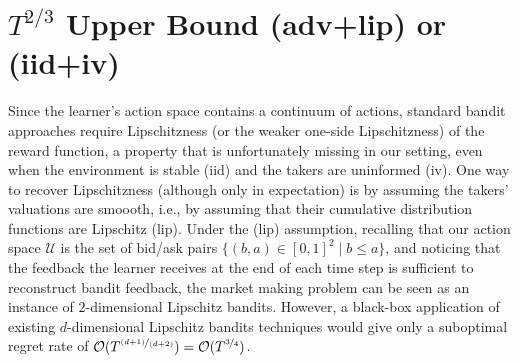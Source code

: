 \documentclass[final,12pt]{colt2025}
\newcommand{\cO}{\mathcal{O}}
\newcommand{\cU}{\mathcal{U}}
\newcommand{\ceq}{\coloneqq}
\newcommand{\nb}{b}
\newcommand{\ns}{a}
\begin{document}
\section{\texorpdfstring{$T^{2/3}$}{T 2/3} Upper Bound (adv+lip) or (iid+iv)}

\label{s:upper}


Since the learner's action space contains a continuum of actions, 
standard bandit approaches require Lipschitzness (or the weaker one-side Lipschitzness) of the reward function, a property that is unfortunately missing in our setting, even when the environment is stable (iid) and the takers are uninformed (iv).
One way to recover Lipschitzness (although only in expectation) is by assuming the takers' valuations are smoooth, i.e., by assuming that their cumulative distribution functions are Lipschitz (lip).
Under the (lip) assumption, recalling that our action space $\cU$ is the set of bid/ask pairs $\{(\nb,\ns) \in [0,1]^2 \mid \nb \le \ns\}$, and noticing that the feedback the learner receives at the end of each time step is sufficient to reconstruct bandit feedback, the market making problem can be seen as an instance of $2$-dimensional Lipschitz bandits.
However, a black-box application of existing $d$-dimensional Lipschitz bandits techniques \citep[with $d=2$]{slivkins2019introduction} would give only a suboptimal regret rate of $\cO(T^{\nicefrac{(d+1)}{(d+2)}}) = \cO(T^{\nicefrac{3}{4}})$.
\end{document}
